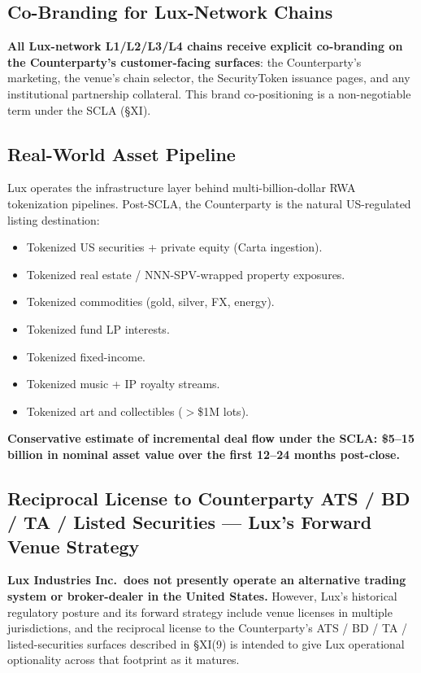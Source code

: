 \documentclass[11pt,letterpaper]{article}
\begin{document}
\subsection*{Co-Branding for Lux-Network Chains}

\textbf{All Lux-network L1/L2/L3/L4 chains receive explicit
co-branding on the Counterparty's customer-facing surfaces}: the
Counterparty's marketing, the venue's chain selector, the
SecurityToken issuance pages, and any institutional partnership
collateral. This brand co-positioning is a non-negotiable term
under the SCLA (\S XI).

\subsection*{Real-World Asset Pipeline}

Lux operates the infrastructure layer behind multi-billion-dollar
RWA tokenization pipelines. Post-SCLA, the Counterparty is the
natural US-regulated listing destination:

\begin{itemize}[leftmargin=1.5em,itemsep=0.1em]
\item Tokenized US securities + private equity (Carta ingestion).
\item Tokenized real estate / NNN-SPV-wrapped property exposures.
\item Tokenized commodities (gold, silver, FX, energy).
\item Tokenized fund LP interests.
\item Tokenized fixed-income.
\item Tokenized music + IP royalty streams.
\item Tokenized art and collectibles ($>$\$1M lots).
\end{itemize}

\textbf{Conservative estimate of incremental deal flow under the
SCLA: \$5--15 billion in nominal asset value over the first 12--24
months post-close.}

\subsection*{Reciprocal License to Counterparty ATS / BD / TA / Listed Securities --- Lux's Forward Venue Strategy}

\textbf{Lux Industries Inc.\ does not presently operate an
alternative trading system or broker-dealer in the United States.}
However, Lux's historical regulatory posture and its forward strategy
include venue licenses in multiple jurisdictions, and the reciprocal
license to the Counterparty's ATS / BD / TA / listed-securities
surfaces described in \S XI(9) is intended to give Lux operational
optionality across that footprint as it matures.
\end{document}
